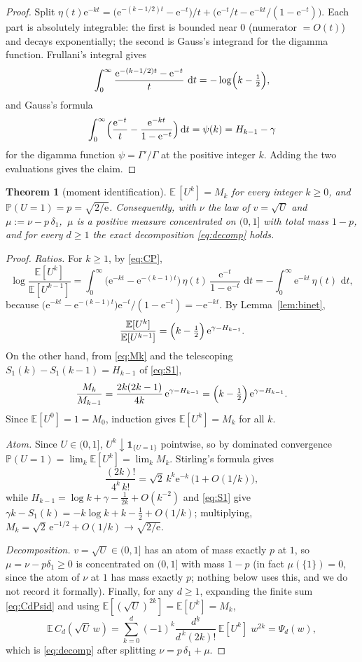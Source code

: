 \documentclass[11pt]{amsart}
\newtheorem{theorem}{Theorem}[section]
\theoremstyle{definition}
\theoremstyle{remark}
\newcommand{\dd}{\,\mathrm{d}}
\newcommand{\e}{\mathrm{e}}
\newcommand{\E}{\mathbb{E}}
\newcommand{\Prob}{\mathbb{P}}
\begin{document}
\begin{proof}
Split $\eta(t)\e^{-kt}=\bigl(\e^{-(k-1/2)t}-\e^{-t}\bigr)/t
+\bigl(\e^{-t}/t-\e^{-kt}/(1-\e^{-t})\bigr)$. Each part is absolutely
integrable: the first is bounded near $0$ (numerator $=O(t)$) and
decays exponentially; the second is Gauss's integrand for the digamma
function. Frullani's integral \cite[Sec.~12.16]{ww} gives
\[
\int_0^\infty\frac{\e^{-(k-1/2)t}-\e^{-t}}{t}\,\dd t
=-\log\Bigl(k-\tfrac12\Bigr),
\]
and Gauss's formula \cite[Sec.~12.3]{ww}
\[
\int_0^\infty\Bigl(\frac{\e^{-t}}{t}-\frac{\e^{-kt}}{1-\e^{-t}}\Bigr)\dd t
=\psi(k)=H_{k-1}-\gamma
\]
for the digamma function $\psi=\Gamma'/\Gamma$ at the positive integer
$k$. Adding the two evaluations gives the claim.
\end{proof}

\begin{theorem}[moment identification]\label{thm:moments}
$\E\,[U^k]=M_k$ for every integer $k\ge 0$, and
$\Prob(U=1)=p=\sqrt{2/\e}$. Consequently, with $\nu$ the law of
$v=\sqrt{U}$ and $\mu:=\nu-p\,\delta_1$,\, $\mu$ is a positive measure
concentrated on $(0,1]$ with total mass $1-p$, and for every $d\ge 1$ the
exact decomposition \eqref{eq:decomp} holds.
\end{theorem}

\begin{proof}
\emph{Ratios.} For $k\ge 1$, by \eqref{eq:CP},
\[
\log\frac{\E[U^k]}{\E[U^{k-1}]}
=\int_0^\infty\bigl(\e^{-kt}-\e^{-(k-1)t}\bigr)
\,\eta(t)\,\frac{\e^{-t}}{1-\e^{-t}}\,\dd t
=-\int_0^\infty \e^{-kt}\,\eta(t)\,\dd t,
\]
because $\bigl(\e^{-kt}-\e^{-(k-1)t}\bigr)\e^{-t}/(1-\e^{-t})
=-\e^{-kt}$. By Lemma~\ref{lem:binet},
\begin{equation}\label{eq:ratio}
\frac{\E[U^k]}{\E[U^{k-1}]}
=\Bigl(k-\tfrac12\Bigr)\,\e^{\gamma-H_{k-1}} .
\end{equation}
On the other hand, from \eqref{eq:Mk} and the telescoping
$S_1(k)-S_1(k-1)=H_{k-1}$ of \eqref{eq:S1},
\[
\frac{M_k}{M_{k-1}}
=\frac{2k(2k-1)}{4k}\,\e^{\gamma-H_{k-1}}
=\Bigl(k-\tfrac12\Bigr)\,\e^{\gamma-H_{k-1}} .
\]
Since $\E[U^0]=1=M_0$, induction gives $\E[U^k]=M_k$ for all $k$.

\emph{Atom.} Since $U\in(0,1]$, $U^k\downarrow\mathbf 1_{\{U=1\}}$
pointwise, so by dominated convergence
$\Prob(U=1)=\lim_k \E[U^k]=\lim_k M_k$. Stirling's formula gives
\[
\frac{(2k)!}{4^k\,k!}=\sqrt2\,k^k\e^{-k}\,\bigl(1+O(1/k)\bigr),
\]
while $H_{k-1}=\log k+\gamma-\tfrac1{2k}+O(k^{-2})$ and \eqref{eq:S1}
give $\gamma k-S_1(k)=-k\log k+k-\tfrac12+O(1/k)$; multiplying,
$M_k=\sqrt2\,\e^{-1/2}+O(1/k)\to\sqrt{2/\e}$.

\emph{Decomposition.} $v=\sqrt U\in(0,1]$ has an atom of mass exactly
$p$ at $1$, so $\mu=\nu-p\delta_1\ge 0$ is concentrated on $(0,1]$
with mass $1-p$ (in fact $\mu(\{1\})=0$, since the atom of $\nu$ at
$1$ has mass exactly $p$; nothing below uses this, and we do not
record it formally). Finally, for any $d\ge 1$,
expanding the finite sum \eqref{eq:CdPsid} and using
$\E[(\sqrt U)^{2k}]=\E[U^k]=M_k$,
\[
\E\,C_d(\sqrt U\,w)
=\sum_{k=0}^{d}(-1)^k\frac{d^{\underline k}}{d^{\,k}(2k)!}\,
\E[U^k]\;w^{2k}
=\Psi_d(w),
\]
which is \eqref{eq:decomp} after splitting $\nu=p\,\delta_1+\mu$.
\end{proof}
\end{document}
